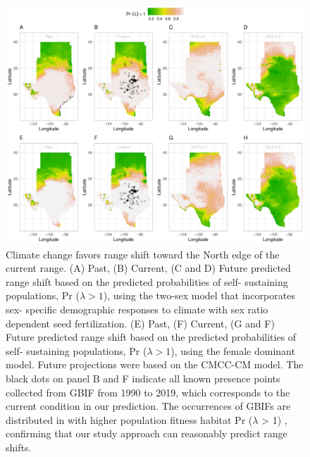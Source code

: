 \documentclass[12pt]{article}\usepackage[]{graphicx}\usepackage[dvipsnames]{xcolor}
\begin{document}
\begin{figure}[H]
  \begin{center}
    \includegraphics[width=0.95\linewidth]{Figures/Fig_geoPrlambdacmc.pdf}
  \caption{Climate change favors range shift toward the North edge of the current range.
  (A) Past, (B) Current, (C and D) Future predicted range shift based on the predicted probabilities of self- sustaining populations, Pr ($\lambda > 1$), using the two-sex model that incorporates sex- specific demographic responses to climate with sex ratio dependent seed fertilization.
  (E) Past, (F) Current, (G and F) Future  predicted range shift based on the predicted probabilities of self- sustaining populations, Pr ($\lambda > 1$), using the female dominant model.
  Future projections were based on the  CMCC-CM model.
  The black dots on panel B and F indicate all known presence points collected from GBIF from 1990 to 2019, which corresponds to the current condition in our prediction. 
  The occurrences of GBIFs are distributed in with higher population fitness habitat Pr ($\lambda$ > 1) , confirming that our study approach can reasonably predict range shifts.}
  \label{Sup:geoprojcmc}
  \end{center}
\end{figure}
\end{document}
